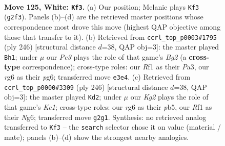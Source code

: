 \documentclass[11pt]{article}
\begin{document}
\begin{figure}[p]\centering
\begin{subfigure}{0.46\textwidth}\centering
\resizebox{\linewidth}{!}{%
\newchessgame
\chessboard[
  setfen={7k/8/p5r1/P1p2p1p/1p3P1P/1P2P1P1/6K1/5R2 w - - 37 125},
  showmover=false,
  pgfstyle=straightmove, color=movearrow, markmove={g2-f3}
]}
\caption{}
\end{subfigure}\hfill
\begin{subfigure}{0.46\textwidth}\centering
\resizebox{\linewidth}{!}{%
\newchessgame
\chessboard[
  setfen={2b5/p4p2/1p1k2p1/7p/1P3P1P/P1K3P1/6B1/8 w - - 75 124},
  showmover=false,
  pgfstyle=straightmove, color=movearrow, markmove={g2-h1}
]}
\caption{}
\end{subfigure}
\\[4pt]
\begin{subfigure}{0.46\textwidth}\centering
\resizebox{\linewidth}{!}{%
\newchessgame
\chessboard[
  setfen={8/1b6/3k2N1/1p3p2/p1pP1Pp1/P1P3P1/1P6/2K5 w - - 29 124},
  showmover=false,
  pgfstyle=straightmove, color=movearrow, markmove={c1-d2}
]}
\caption{}
\end{subfigure}\hfill

\caption{\textbf{Move 125, White: \texttt{Kf3}.} (a) Our position; Melanie plays \texttt{Kf3} (\texttt{g2f3}). Panels (b)--(d) are the retrieved master positions whose correspondence most drove this move (highest QAP objective among those that transfer to it). (b) Retrieved from \texttt{ccrl\_top\_p0003\#1795} (ply 246) [structural distance $d$=38, QAP obj=3]: the master played \texttt{Bh1}; under $\mu$ our \emph{Pe3} plays the role of that game's \emph{Bg2} (a \textbf{cross-type} correspondence); cross-type roles: our \emph{R}f1 as their \emph{P}a3, our \emph{r}g6 as their \emph{p}g6; transferred move \texttt{e3e4}. (c) Retrieved from \texttt{ccrl\_top\_p0000\#3309} (ply 246) [structural distance $d$=38, QAP obj=3]: the master played \texttt{Kd2}; under $\mu$ our \emph{Kg2} plays the role of that game's \emph{Kc1}; cross-type roles: our \emph{r}g6 as their \emph{p}b5, our \emph{R}f1 as their \emph{N}g6; transferred move \texttt{g2g1}. Synthesis: no retrieved analog transferred to \texttt{Kf3} -- the \texttt{search} selector chose it on value (material / mate); panels (b)--(d) show the strongest nearby analogies.}
\label{fig:thought-m248}
\end{figure}
\end{document}
